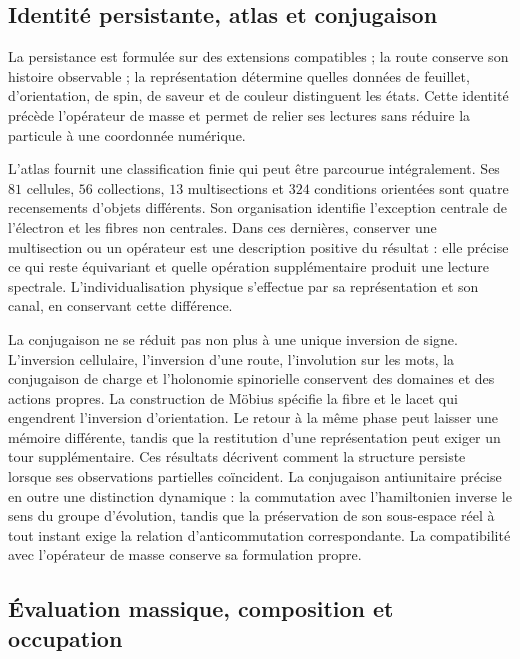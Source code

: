 \subsection{Identité persistante, atlas et conjugaison}

La persistance est formulée sur des extensions compatibles ; la route
conserve son histoire observable ; la représentation détermine quelles données de
feuillet, d’orientation, de spin, de saveur et de couleur distinguent les états. Cette
identité précède l’opérateur de masse et permet de relier ses lectures
sans réduire la particule à une coordonnée numérique.

L’atlas fournit une classification finie qui peut être parcourue
intégralement. Ses \(81\) cellules, \(56\) collections, \(13\) multisections et
\(324\) conditions orientées sont quatre recensements d’objets différents.
Son organisation identifie l’exception centrale de l’électron et les
fibres non centrales. Dans ces dernières, conserver une multisection ou un
opérateur est une description positive du résultat : elle précise ce qui reste
équivariant et quelle opération supplémentaire produit une lecture spectrale.
L’individualisation physique s’effectue par sa représentation et son
canal, en conservant cette différence.

La conjugaison ne se réduit pas non plus à une unique inversion de signe.
L’inversion cellulaire, l’inversion d’une route, l’involution sur les
mots, la conjugaison de charge et l’holonomie spinorielle conservent
des domaines et des actions propres. La construction de Möbius spécifie la
fibre et le lacet qui engendrent l’inversion d’orientation. Le retour à la
même phase peut laisser une mémoire différente, tandis que la restitution d’une
représentation peut exiger un tour supplémentaire. Ces résultats
décrivent comment la structure persiste lorsque ses observations partielles
coïncident.
La conjugaison antiunitaire précise en outre une distinction dynamique :
la commutation avec l’hamiltonien inverse le sens du groupe
d’évolution, tandis que la préservation de son sous-espace réel à tout instant
exige la relation d’anticommutation correspondante. La compatibilité
avec l’opérateur de masse conserve sa formulation propre.

\subsection{Évaluation massique, composition et occupation}

